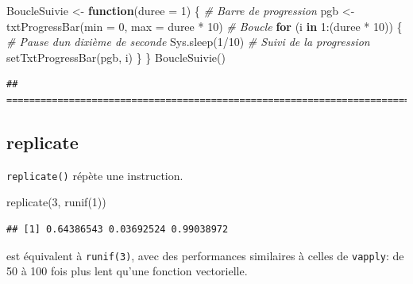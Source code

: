 \documentclass[
  11pt,
  french,
  a4paper,
  extrafontsizes,onecolumn,openright
  ]{memoir}
\newenvironment{Shaded}{\begin{snugshade}}{\end{snugshade}}
\newcommand{\AttributeTok}[1]{\textcolor[rgb]{0.77,0.63,0.00}{#1}}
\newcommand{\CommentTok}[1]{\textcolor[rgb]{0.56,0.35,0.01}{\textit{#1}}}
\newcommand{\ControlFlowTok}[1]{\textcolor[rgb]{0.13,0.29,0.53}{\textbf{#1}}}
\newcommand{\DecValTok}[1]{\textcolor[rgb]{0.00,0.00,0.81}{#1}}
\newcommand{\FunctionTok}[1]{\textcolor[rgb]{0.00,0.00,0.00}{#1}}
\newcommand{\NormalTok}[1]{#1}
\newcommand{\OtherTok}[1]{\textcolor[rgb]{0.56,0.35,0.01}{#1}}
\newcommand{\SpecialCharTok}[1]{\textcolor[rgb]{0.00,0.00,0.00}{#1}}
\begin{document}
\begin{Shaded}
\begin{Highlighting}[]
\NormalTok{BoucleSuivie }\OtherTok{\textless{}{-}} \ControlFlowTok{function}\NormalTok{(}\AttributeTok{duree =} \DecValTok{1}\NormalTok{) \{}
    \CommentTok{\# Barre de progression}
\NormalTok{    pgb }\OtherTok{\textless{}{-}} \FunctionTok{txtProgressBar}\NormalTok{(}\AttributeTok{min =} \DecValTok{0}\NormalTok{, }\AttributeTok{max =}\NormalTok{ duree }\SpecialCharTok{*} \DecValTok{10}\NormalTok{)}
    \CommentTok{\# Boucle}
    \ControlFlowTok{for}\NormalTok{ (i }\ControlFlowTok{in} \DecValTok{1}\SpecialCharTok{:}\NormalTok{(duree }\SpecialCharTok{*} \DecValTok{10}\NormalTok{)) \{}
        \CommentTok{\# Pause d\textquotesingle{}un dixième de seconde}
        \FunctionTok{Sys.sleep}\NormalTok{(}\DecValTok{1}\SpecialCharTok{/}\DecValTok{10}\NormalTok{)}
        \CommentTok{\# Suivi de la progression}
        \FunctionTok{setTxtProgressBar}\NormalTok{(pgb, i)}
\NormalTok{    \}}
\NormalTok{\}}
\FunctionTok{BoucleSuivie}\NormalTok{()}
\end{Highlighting}
\end{Shaded}

\begin{verbatim}
## ================================================================================
\end{verbatim}

\normalsize

\hypertarget{replicate}{%
\subsection{replicate}\label{replicate}}

\texttt{replicate()} répète une instruction.

\scriptsize

\begin{Shaded}
\begin{Highlighting}[]
\FunctionTok{replicate}\NormalTok{(}\DecValTok{3}\NormalTok{, }\FunctionTok{runif}\NormalTok{(}\DecValTok{1}\NormalTok{))}
\end{Highlighting}
\end{Shaded}

\begin{verbatim}
## [1] 0.64386543 0.03692524 0.99038972
\end{verbatim}

\normalsize

est équivalent à \texttt{runif(3)}, avec des performances similaires à celles de \texttt{vapply}: de 50 à 100 fois plus lent qu'une fonction vectorielle.
\end{document}
